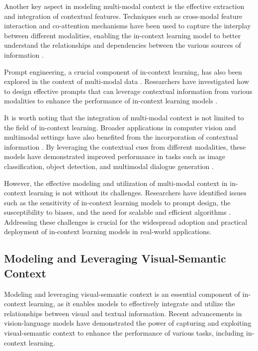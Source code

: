 \documentclass[11pt]{article}
\begin{document}
Another key aspect in modeling multi-modal context is the effective extraction and integration of contextual features. Techniques such as cross-modal feature interaction and co-attention mechanisms have been used to capture the interplay between different modalities, enabling the in-context learning model to better understand the relationships and dependencies between the various sources of information \cite{ref136,ref137}.

Prompt engineering, a crucial component of in-context learning, has also been explored in the context of multi-modal data \cite{ref11,ref138}. Researchers have investigated how to design effective prompts that can leverage contextual information from various modalities to enhance the performance of in-context learning models \cite{ref139,ref140}.

It is worth noting that the integration of multi-modal context is not limited to the field of in-context learning. Broader applications in computer vision and multimodal settings have also benefited from the incorporation of contextual information \cite{ref141,ref142}. By leveraging the contextual cues from different modalities, these models have demonstrated improved performance in tasks such as image classification, object detection, and multimodal dialogue generation \cite{ref143,ref144}.

However, the effective modeling and utilization of multi-modal context in in-context learning is not without its challenges. Researchers have identified issues such as the sensitivity of in-context learning models to prompt design, the susceptibility to biases, and the need for scalable and efficient algorithms \cite{ref139,ref145}. Addressing these challenges is crucial for the widespread adoption and practical deployment of in-context learning models in real-world applications.

\subsection{Modeling and Leveraging Visual-Semantic Context}

Modeling and leveraging visual-semantic context is an essential component of in-context learning, as it enables models to effectively integrate and utilize the relationships between visual and textual information. Recent advancements in vision-language models have demonstrated the power of capturing and exploiting visual-semantic context to enhance the performance of various tasks, including in-context learning.
\end{document}
